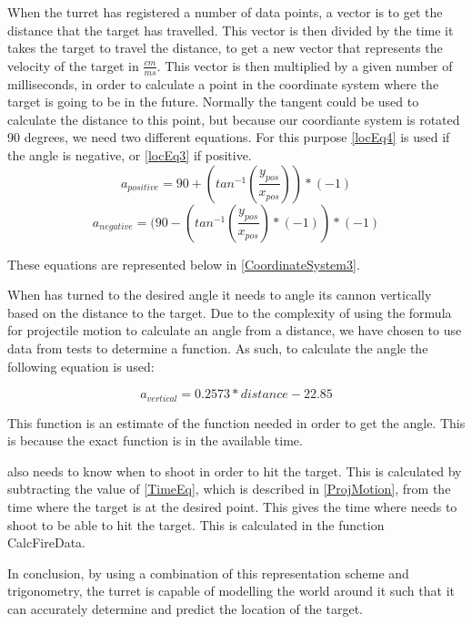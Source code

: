 When the turret has registered a number of data points, a vector is
 to get the distance that the target has travelled.
This vector is then divided by the time it takes the target to travel the distance, to get a
new vector that represents the velocity of the target in $\frac{cm}{ms}$. This
vector is then multiplied by a given number of milliseconds, in order to
calculate a point in the coordinate system where the target is going to be in
the future. Normally the tangent could be used to calculate the distance
to this point, but because our coordiante system is rotated 90 degrees, we need two
different equations. For this purpose \autoref{locEq4} is used if the angle is
negative, or \autoref{locEq3} if positive.
\begin{equation}\label{locEq3}
a_{positive}=90+(tan^{-1}(\frac{y_{pos}}{x_{pos}}))*(-1)
\end{equation} 
\begin{equation}\label{locEq4}
a_{negative}=(90-(tan^{-1}(\frac{y_{pos}}{x_{pos}})*(-1))*(-1)
\end{equation} 

These equations are represented below in \autoref{CoordinateSystem3}.


When \name has turned to the desired angle it needs to angle its cannon
vertically based on the distance to the target. Due to the complexity of using
the formula for projectile motion to calculate an angle from a distance, we have
chosen to use data from tests to determine a function. As such, to calculate the
angle the following equation is used:

\begin{equation}\label{locEq4}
a_{vertical}=0.2573*distance-22.85
\end{equation} 


 This function is an estimate of the
function needed in order to get the angle. This is because the exact function
is  in the available time.\nl


\name also needs to know when to shoot in order to hit the target.
This is calculated by subtracting the value of \autoref{TimeEq}, which is described in
\autoref{ProjMotion}, from the time where the target is at the desired point.
This gives the time where \name needs to shoot to be able to hit the target.
This is calculated in the function CalcFireData.

In conclusion, by using a combination of this representation scheme and
trigonometry, the turret is capable of modelling the world around it such that
it can accurately determine and predict the location of the target.